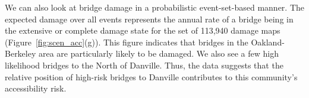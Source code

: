 We can also look at bridge damage in a probabilistic event-set-based manner. The expected damage over all events represents the annual rate of a bridge being in the extensive or complete damage state for the set of 113,940 damage maps (Figure~\ref{fig:scen_acc}{(g)}). This figure indicates that bridges in the Oakland-Berkeley area are particularly likely to be damaged. We also see a few high likelihood bridges to the North of Danville. Thus, the data suggests that the relative position of high-risk bridges to Danville contributes to this community's accessibility risk.



